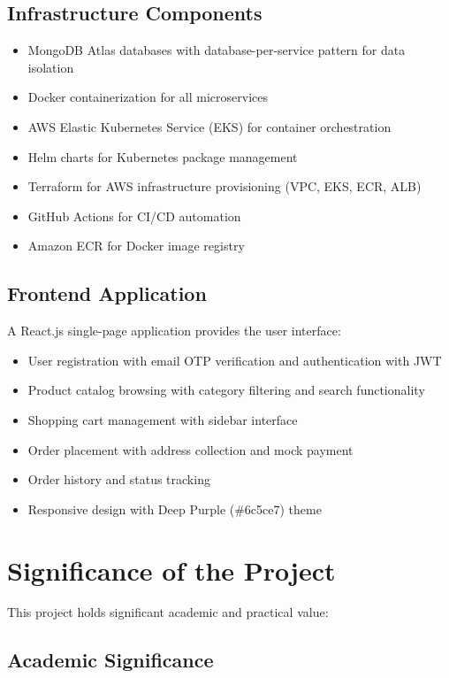 \subsection{Infrastructure Components}

\begin{itemize}
    \item MongoDB Atlas databases with database-per-service pattern for data isolation
    \item Docker containerization for all microservices
    \item AWS Elastic Kubernetes Service (EKS) for container orchestration
    \item Helm charts for Kubernetes package management
    \item Terraform for AWS infrastructure provisioning (VPC, EKS, ECR, ALB)
    \item GitHub Actions for CI/CD automation
    \item Amazon ECR for Docker image registry
\end{itemize}

\subsection{Frontend Application}

A React.js single-page application provides the user interface:

\begin{itemize}
    \item User registration with email OTP verification and authentication with JWT
    \item Product catalog browsing with category filtering and search functionality
    \item Shopping cart management with sidebar interface
    \item Order placement with address collection and mock payment
    \item Order history and status tracking
    \item Responsive design with Deep Purple (\#6c5ce7) theme
\end{itemize}

\section{Significance of the Project}

This project holds significant academic and practical value:

\subsection{Academic Significance}

